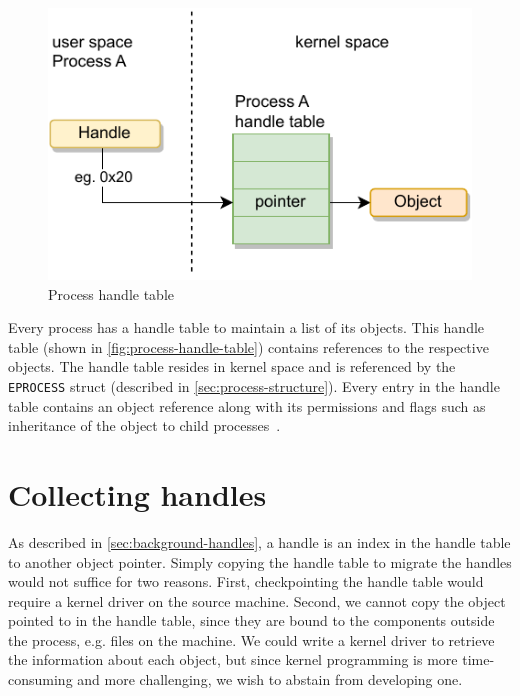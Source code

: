\documentclass[a4paper, 11pt, english]{report}
\begin{document}
\begin{figure}[h]
\centerline{\includegraphics{images/handle-table.drawio-3.pdf}}
\caption{Process handle table}
\label{fig:process-handle-table}
\end{figure}

Every process has a handle table to maintain a list of its objects. This handle table (shown in \autoref{fig:process-handle-table}) contains references to the respective objects. The handle table resides in kernel space and is referenced by the \texttt{EPROCESS} struct (described in \autoref{sec:process-structure}). Every entry in the handle table contains an object reference along with its permissions and flags such as inheritance of the object to child processes~\cite{windows-internals-2}. 

\section{Collecting handles}
\label{sec:collecting-handles}
As described in \autoref{sec:background-handles}, a handle is an index in the handle table to another object pointer. Simply copying the handle table to migrate the handles would not suffice for two reasons. First, checkpointing the handle table would require a kernel driver on the source machine. Second, we cannot copy the object pointed to in the handle table, since they are bound to the components outside the process, e.g. files on the machine. We could write a kernel driver to retrieve the information about each object, but since kernel programming is more time-consuming and more challenging, we wish to abstain from developing one.
\end{document}
